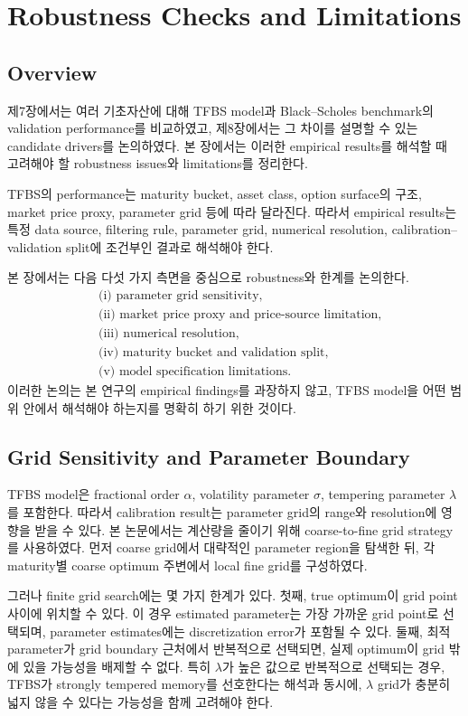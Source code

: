 \documentclass[11pt,a4paper]{report}
\begin{document}
\chapter{Robustness Checks and Limitations}

\section{Overview}

제7장에서는 여러 기초자산에 대해 TFBS model과 Black--Scholes benchmark의 validation performance를 비교하였고, 제8장에서는 그 차이를 설명할 수 있는 candidate drivers를 논의하였다. 본 장에서는 이러한 empirical results를 해석할 때 고려해야 할 robustness issues와 limitations를 정리한다.

TFBS의 performance는 maturity bucket, asset class, option surface의 구조, market price proxy, parameter grid 등에 따라 달라진다. 따라서 empirical results는 특정 data source, filtering rule, parameter grid, numerical resolution, calibration--validation split에 조건부인 결과로 해석해야 한다.

본 장에서는 다음 다섯 가지 측면을 중심으로 robustness와 한계를 논의한다.
\[
\begin{aligned}
&\text{(i) parameter grid sensitivity},\\
&\text{(ii) market price proxy and price-source limitation},\\
&\text{(iii) numerical resolution},\\
&\text{(iv) maturity bucket and validation split},\\
&\text{(v) model specification limitations}.
\end{aligned}
\]
이러한 논의는 본 연구의 empirical findings를 과장하지 않고, TFBS model을 어떤 범위 안에서 해석해야 하는지를 명확히 하기 위한 것이다.

\section{Grid Sensitivity and Parameter Boundary}

TFBS model은 fractional order $\alpha$, volatility parameter $\sigma$, tempering parameter $\lambda$를 포함한다. 따라서 calibration result는 parameter grid의 range와 resolution에 영향을 받을 수 있다. 본 논문에서는 계산량을 줄이기 위해 coarse-to-fine grid strategy를 사용하였다. 먼저 coarse grid에서 대략적인 parameter region을 탐색한 뒤, 각 maturity별 coarse optimum 주변에서 local fine grid를 구성하였다.

그러나 finite grid search에는 몇 가지 한계가 있다. 첫째, true optimum이 grid point 사이에 위치할 수 있다. 이 경우 estimated parameter는 가장 가까운 grid point로 선택되며, parameter estimates에는 discretization error가 포함될 수 있다. 둘째, 최적 parameter가 grid boundary 근처에서 반복적으로 선택되면, 실제 optimum이 grid 밖에 있을 가능성을 배제할 수 없다. 특히 $\lambda$가 높은 값으로 반복적으로 선택되는 경우, TFBS가 strongly tempered memory를 선호한다는 해석과 동시에, $\lambda$ grid가 충분히 넓지 않을 수 있다는 가능성을 함께 고려해야 한다.
\end{document}
